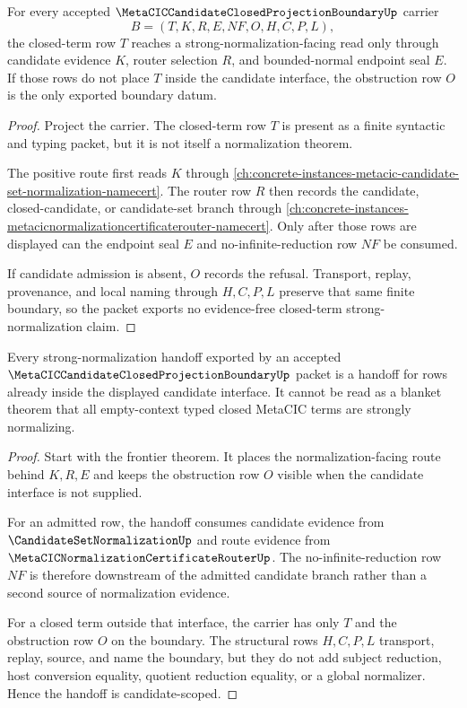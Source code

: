 \begin{theorem}
\label{thm:metacic-candidate-set-closed-projection-frontier}
For every accepted $\MetaCICCandidateClosedProjectionBoundaryUp$ carrier
$$
B=(T,K,R,E,NF,O,H,C,P,L),
$$
the closed-term row $T$ reaches a strong-normalization-facing read only through candidate evidence $K$, router selection $R$, and bounded-normal endpoint seal $E$. If those rows do not place $T$ inside the candidate interface, the obstruction row $O$ is the only exported boundary datum.
\end{theorem}
\begin{proof}
Project the carrier. The closed-term row $T$ is present as a finite syntactic and typing packet, but it is not itself a normalization theorem.

The positive route first reads $K$ through \autoref{ch:concrete-instances-metacic-candidate-set-normalization-namecert}. The router row $R$ then records the candidate, closed-candidate, or candidate-set branch through \autoref{ch:concrete-instances-metacicnormalizationcertificaterouter-namecert}. Only after those rows are displayed can the endpoint seal $E$ and no-infinite-reduction row $NF$ be consumed.

If candidate admission is absent, $O$ records the refusal. Transport, replay, provenance, and local naming through $H,C,P,L$ preserve that same finite boundary, so the packet exports no evidence-free closed-term strong-normalization claim.
\end{proof}

\begin{theorem}
\label{thm:metacic-candidate-set-sn-handoff-boundary}
Every strong-normalization handoff exported by an accepted $\MetaCICCandidateClosedProjectionBoundaryUp$ packet is a handoff for rows already inside the displayed candidate interface. It cannot be read as a blanket theorem that all empty-context typed closed MetaCIC terms are strongly normalizing.
\end{theorem}
\begin{proof}
Start with the frontier theorem. It places the normalization-facing route behind $K,R,E$ and keeps the obstruction row $O$ visible when the candidate interface is not supplied.

For an admitted row, the handoff consumes candidate evidence from $\CandidateSetNormalizationUp$ and route evidence from $\MetaCICNormalizationCertificateRouterUp$. The no-infinite-reduction row $NF$ is therefore downstream of the admitted candidate branch rather than a second source of normalization evidence.

For a closed term outside that interface, the carrier has only $T$ and the obstruction row $O$ on the boundary. The structural rows $H,C,P,L$ transport, replay, source, and name the boundary, but they do not add subject reduction, host conversion equality, quotient reduction equality, or a global normalizer. Hence the handoff is candidate-scoped.
\end{proof}

